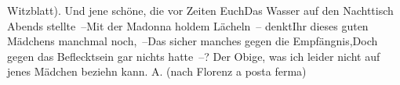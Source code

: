 \begin{ledgroupsized}[t]{13cm}
                     Witzblatt).\pend
           \stanza{}Und jene schöne, die vor Zeiten Euch\newverse{}Das Wasser auf den Nachttisch Abends stellte –\newverse{}Mit der Madonna holdem Lächeln – denkt\newverse{}Ihr dieses guten Mädchens manchmal noch, –\newverse{}Das sicher manches gegen die Empfängnis,\newverse{}Doch gegen das Beflecktsein gar nichts hatte –?\stanzaend{}\pstart
           Der Obige, was ich leider nicht auf jenes Mädchen beziehn kann.\pend
           \pstart
           \spacefill\mbox{A.}\pend
           \pstart
           (nach Florenz a posta ferma)\pend
           
         
         \endnumbering{}\end{ledgroupsized}  \newcommand{\dateiname}{L00374}\newcommand{\titel}{Arthur Schnitzler an Richard Beer-Hofmann, 29. 9. 1894}\newcommand{\editorInnen}{Martin Anton Müller und Gerd-Hermann Susen}
      
